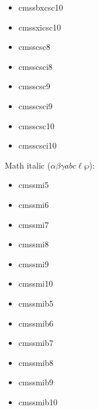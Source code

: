 \documentclass{amsart}
\begin{document}
\noindent\parbox[t]{0.25\textwidth}{
\begin{itemize}
\item \textsf{cmssbxcsc10}
\item \textsf{cmssxicsc10}
\end{itemize}}\parbox[t]{0.25\textwidth}{\begin{itemize}
\item \textsf{cmsscsc8}
\item \textsf{cmsscsci8}
\end{itemize}}\parbox[t]{0.25\textwidth}{\begin{itemize}
\item \textsf{cmsscsc9}
\item \textsf{cmsscsci9}
\end{itemize}}\parbox[t]{0.25\textwidth}{\begin{itemize}
\item \textsf{cmsscsc10}
\item \textsf{cmsscsci10}
\end{itemize}}

\bigskip

Math italic ($\alpha \beta \gamma abc \ell \wp$):

\nobreak

\noindent\parbox[t]{0.25\textwidth}{
\begin{itemize}
\item \textsf{cmssmi5}
\item \textsf{cmssmi6}
\item \textsf{cmssmi7}
\end{itemize}}\parbox[t]{0.25\textwidth}{\begin{itemize}
\item \textsf{cmssmi8}
\item \textsf{cmssmi9}
\item \textsf{cmssmi10}
\end{itemize}}\parbox[t]{0.25\textwidth}{\begin{itemize}
\item \textsf{cmssmib5}
\item \textsf{cmssmib6}
\item \textsf{cmssmib7}
\end{itemize}}\parbox[t]{0.25\textwidth}{\begin{itemize}
\item \textsf{cmssmib8}
\item \textsf{cmssmib9}
\item \textsf{cmssmib10}
\end{itemize}}
\end{document}
